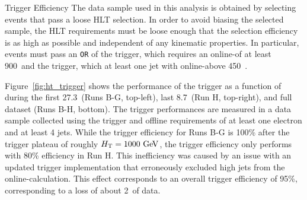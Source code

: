 \begin{section}{Trigger Efficiency}
The data sample used in this analysis is obtained by selecting events that pass a loose HLT selection.
In order to avoid biasing the selected sample, the HLT requirements must be loose enough that the selection efficiency is as high as possible and independent of any kinematic properties.
In particular, events must pass an \texttt{OR} of the \trigHT trigger, which requires an online-\HT of at least 900~\GeV and the \trigJet trigger, which at least one jet with online-\pT above 450~\GeV.

Figure~\ref{fig:ht_trigger} shows the performance of the \trigHT trigger as a function of \HT during the first 27.3~\ifb (Runs B-G, top-left), last 8.7~\ifb (Run H, top-right), and full dataset (Runs B-H, bottom).
The trigger performances are measured in a data sample collected using the \trigEle trigger and offline requirements of at least one electron and at least 4 jets.
While the trigger efficiency for Runs B-G is 100\% after the trigger plateau of roughly $H_{\mathrm{T}} = 1000~\mathrm{Ge\kern -0.1em V}$, the trigger efficiency only performs with 80\% efficiency in Run H.
This inefficiency was caused by an issue with an updated trigger implementation that erroneously excluded high \pT jets from the online-\HT calculation.
This effect corresponds to an overall trigger efficiency of 95\%, corresponding to a loss of about 2~\ifb of data.


\end{section}
